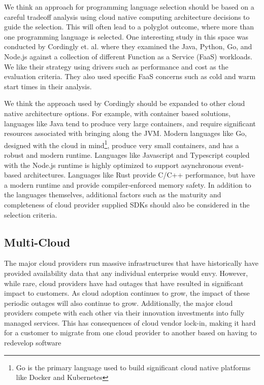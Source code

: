\documentclass[conference]{IEEEconf}
\begin{document}
We think an approach for programming language selection should be based on a careful tradeoff analysis using cloud native computing architecture decisions to guide the selection.  This will often lead to a polyglot outcome, where more than one programming language is selected.  One interesting study in this space was conducted by Cordingly et. al.\cite{Serverless} where they examined the Java, Python, Go, and Node.js against a collection of different Function as a Service (FaaS) workloads.  We like their strategy using drivers such as performance and cost as the evaluation criteria.  They also used specific FaaS concerns such as cold and warm start times in their analysis. 

We think the approach used by Cordingly should be expanded to other cloud native architecture options.  For example, with container based solutions, languages like Java tend to produce very large containers, and require significant resources associated with bringing along the JVM.  Modern languages like Go, designed with the cloud in mind\footnote{Go is the primary language used to build significant cloud native platforms like Docker and Kubernetes}, produce very small containers, and has a robust and modern runtime.  Languages like Javascript and Typescript coupled with the Node.js runtime is highly optimized to support asynchronous event-based architectures. Languages like Rust provide C/C++ performance, but have a modern runtime and provide compiler-enforced memory safety. In addition to the languages themselves, additional factors such as the maturity and completeness of cloud provider supplied SDKs should also be considered in the selection criteria. 

\subsection{Multi-Cloud}
The major cloud providers run massive infrastructures that have historically have provided availability data that any individual enterprise would envy. However, while rare, cloud providers have had outages that have resulted in significant impact to customers. As cloud adoption continues to grow, the impact of these periodic outages will also continue to grow.  Additionally, the major cloud providers compete with each other via their innovation investments into fully managed services.  This has consequences of cloud vendor lock-in, making it hard for a customer to migrate from one cloud provider to another based on having to redevelop software 
\end{document}
